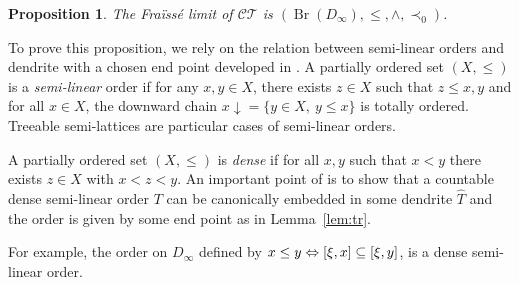 \documentclass[JEP,XML,SOM,Unicode,NoFloatCountersInSection]{cedram}
\newcommand\ssi{\mathchoice{\iff}{\Leftrightarrow}{\Leftrightarrow}{\Leftrightarrow}}
\let\mathcal\mathscr
\theoremstyle{plain}
\newtheorem{prop}[thm]{Proposition}
\theoremstyle{definition}
\newcommand{\cCT}{\mathcal{CT}}
\newcommand{\da}[1]{{#1\!\downarrow}}
\DeclareMathOperator{\Br}{Br}
\begin{document}
\begin{prop}\label{fraise}The Fraïssé limit of $\cCT$ is $(\Br(D_\infty),\leq,\wedge,\prec_0)$.\end{prop}

To prove this proposition, we rely on the relation between semi-linear orders and dendrite with a chosen end point developed in \cite[\S 5]{DM_dendritesII}. A partially ordered set $(X,\leq)$ is a \emph{semi-linear} order if for any $x,y\in X$, there exists $z\in X$ such that $z\leq x,y$ and for all
$x\in X$, the downward chain $\da x=\{y\in X,\ y\leq x\}$ is totally ordered. Treeable semi-lattices are particular cases of semi-linear orders.

A partially ordered set $(X,\leq)$ is \emph{dense} if for all $x,y$ such that $x<y$ there exists $z\in X$ with $x<z<y$. An important point of \cite[\S 5]{DM_dendritesII} is to show that a countable dense semi-linear order $T$ can be canonically embedded in some dendrite $\widehat{T}$ and the order is given by some end point as in Lemma~\ref{lem:tr}.

For example, the order on $D_\infty$ defined by $x\leq y\ssi [\xi,x]\subseteq[\xi,y]$, is a dense semi-linear order.
\end{document}
